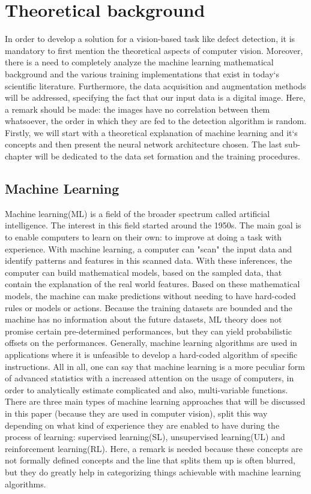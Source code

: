 \documentclass[12pt,a4paper,twoside]{report}
\begin{document}
\chapter{Theoretical background}
\label{ch:analysis}
In order to develop a solution for a vision-based task like defect detection, it is mandatory to first mention the theoretical aspects of computer vision. Moreover, there is a need to completely analyze the machine learning mathematical background and the various training implementations that exist in today`s scientific literature. Furthermore, the data acquisition and augmentation methods will be addressed, specifying the fact that our input data is a digital image. Here, a remark should be made: the images have no correlation between them whatsoever, the order in which they are fed to the detection algorithm is random. Firstly, we will start with a theoretical explanation of machine learning and it`s concepts and then present the neural network architecture chosen. The last sub-chapter will be dedicated to the data set formation and the training procedures.\par 

\section{Machine Learning}
Machine learning(ML) is a field of the broader spectrum called artificial intelligence. The interest in this field started around the 1950s. The main goal is to enable computers to learn on their own: to improve at doing a task with experience. With machine learning, a computer can "scan" the input data and identify patterns and features in this scanned data. With these inferences, the computer can build mathematical models, based on the sampled data, that contain the explanation of the real world features. Based on these mathematical models, the machine can make predictions without needing to have hard-coded rules or models or actions. Because the training datasets are bounded and the machine has no information about the future datasets, ML theory does not promise certain pre-determined performances, but they can yield probabilistic offsets on the performances. Generally, machine learning algorithms are used in applications where it is unfeasible to develop a hard-coded algorithm of specific instructions. All in all, one can say that machine learning is a more peculiar form of advanced statistics with a increased attention on the usage of computers, in order to analytically estimate complicated and also, multi-variable functions. There are three main types of machine learning approaches that will be discussed in this paper (because they are used in computer vision), split this way depending on what kind of experience they are enabled to have during the process of learning: supervised learning(SL), unsupervised learning(UL) and reinforcement learning(RL). Here, a remark is needed because these concepts are not formally defined concepts and the line that splits them up is often blurred, but they do greatly help in categorizing things achievable with machine learning algorithms.\par
\end{document}
